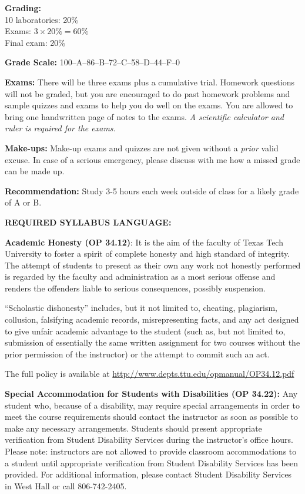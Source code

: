 \documentclass[11pt]{NSF}
\begin{document}
{\bf Grading:}\\
10 laboratories: 20\%\\
Exams: $3\times 20\% = 60\%$\\
Final exam: 20\%

{\bf Grade Scale:} 100--A--86--B--72--C--58--D--44--F--0
 
{\bf Exams:}
There will be three exams plus a cumulative trial.
Homework questions will not be graded, but you are encouraged
to do past homework problems and sample quizzes and exams
to help you do well on the exams.
You are allowed to bring one handwritten page of notes to the exams.
{\em A scientific calculator and ruler is required for the exams.}

{\bf Make-ups:}
Make-up exams and quizzes are not given without a {\em prior} valid excuse.
In case of a serious emergency, please discuss with me how a missed
grade can be made up.

{\bf Recommendation:} 
Study 3-5 hours each week outside of class for a likely grade of A or B.

\newpage
{\bf REQUIRED SYLLABUS LANGUAGE:}

{\bf Academic Honesty (OP 34.12)}:
It is the aim of the faculty of Texas Tech University to foster a
spirit of complete honesty and high standard of integrity. The attempt
of students to present as their own any work not honestly performed is
regarded by the faculty and administration as a most serious offense
and renders the offenders liable to serious consequences, possibly
suspension. 

“Scholastic dishonesty” includes, but it not limited to,
cheating, plagiarism, collusion, falsifying academic records,
misrepresenting facts, and any act designed to give unfair academic
advantage to the student (such as, but not limited to, submission of
essentially the same written assignment for two courses without the
prior permission of the instructor) or the attempt to commit such an
act.  

The full policy is available at
\url{http://www.depts.ttu.edu/opmanual/OP34.12.pdf} 

{\bf Special Accommodation for Students with Disabilities 
(OP 34.22):} 
Any student who, because of
a disability, may require special arrangements in order to meet the
course requirements should contact the instructor as soon as possible
to make any necessary arrangements. Students should present
appropriate verification from Student Disability Services during the
instructor's office hours. Please note: instructors are not allowed to
provide classroom accommodations to a student until appropriate
verification from Student Disability Services has been provided. For
additional information, please contact Student Disability Services in
West Hall or call 806-742-2405.  
\end{document}
